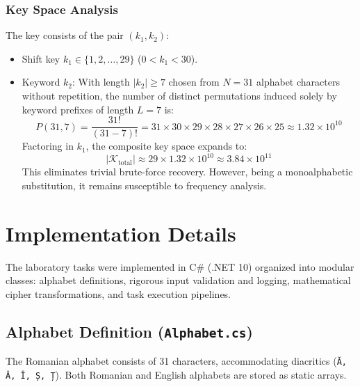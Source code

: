 \documentclass[12pt,a4paper]{article}
\begin{document}
\subsubsection{Key Space Analysis}
The key consists of the pair $(k_1, k_2)$:
\begin{itemize}
    \item Shift key $k_1 \in \{1, 2, \dots, 29\}$ ($0 < k_1 < 30$).
    \item Keyword $k_2$: With length $|k_2| \ge 7$ chosen from $N = 31$ alphabet characters without repetition, the number of distinct permutations induced solely by keyword prefixes of length $L = 7$ is:
    \begin{equation}
        P(31, 7) = \frac{31!}{(31 - 7)!} = 31 \times 30 \times 29 \times 28 \times 27 \times 26 \times 25 \approx 1.32 \times 10^{10}
    \end{equation}
    Factoring in $k_1$, the composite key space expands to:
    \begin{equation}
        |\mathcal{K}_{\text{total}}| \approx 29 \times 1.32 \times 10^{10} \approx 3.84 \times 10^{11}
    \end{equation}
    This eliminates trivial brute-force recovery. However, being a monoalphabetic substitution, it remains susceptible to frequency analysis.
\end{itemize}

\section{Implementation Details}

The laboratory tasks were implemented in C\# (.NET 10) organized into modular classes: alphabet definitions, rigorous input validation and logging, mathematical cipher transformations, and task execution pipelines.

\subsection{Alphabet Definition (\texttt{Alphabet.cs})}
The Romanian alphabet consists of 31 characters, accommodating diacritics (\texttt{Ă, Â, Î, Ș, Ț}). Both Romanian and English alphabets are stored as static arrays.
\end{document}
